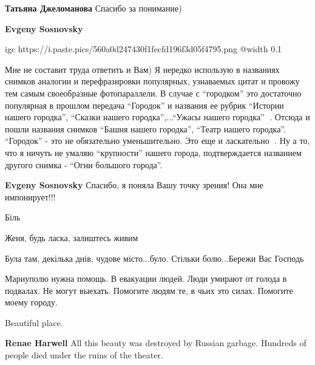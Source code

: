 \begin{itemize} %
\textbf{Татьяна Джеломанова} Спасибо за понимание)

\textbf{Evgeny Sosnovsky}

\ifcmt
  igc https://i.paste.pics/560a0d247430f1fecfd196f3d05f4795.png
	@width 0.1
\fi


Мне не составит труда ответить и Вам) Я нередко использую в названиях снимков
аналогии и перефразировки популярных, узнаваемых цитат и провожу тем самым
своеобразные фотопараллели. В случае с \enquote{городком} это достаточно популярная в
прошлом передача \enquote{Городок} и названия ее рубрик \enquote{Истории нашего городка},
\enquote{Сказки нашего городка},...\enquote{Ужасы нашего городка} 🙂. Отсюда и пошли названия
снимков \enquote{Башня нашего городка}, \enquote{Театр нашего городка}. \enquote{Городок} - это не
обязательно уменьшительно. Это еще и ласкательно 🙂. Ну а то, что я ничуть не
умаляю \enquote{крупности} нашего города, подтверждается названием другого снимка -
\enquote{Огни большого города}. 

\textbf{Evgeny Sosnovsky} Спасибо, я поняла Вашу точку зрения! Она мне импонирует!!!

\end{itemize} %


Біль


Женя, будь ласка, залиштесь живим


Була там, декілька днів, чудове місто...було. Стільки болю...Бережи Вас Господь🤗🙏


Мариуполю нужна помощь. В евакуации людей. Люди умирают от голода в подвалах.
Не могут выехать. Помогите людям те, в чьих это силах. Помогите моему городу.


Beautiful place.

\begin{itemize} %
\textbf{Renae Harwell} All this beauty was destroyed by Russian garbage. Hundreds of people died under the ruins of the theater.
\end{itemize} %


